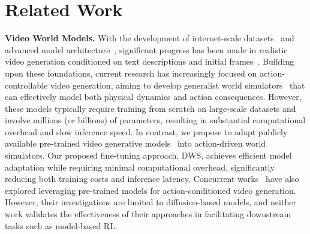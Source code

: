 \section{Related Work}
\textbf{Video World Models.} With the development of internet-scale datasets~\citep{Bain21,chen2024panda70m} and advanced model architecture~\citep{peebles2023dit,videoworldsimulators2024}, significant progress has been made in realistic video generation conditioned on text descriptions and
initial frames~\citep{blattmann2023SDVideo,lin2024opensoraplan, ma2024latte, yang2024cogvideox,opensora}. Building upon these foundations, current research has increasingly focused on action-controllable video generation, aiming to develop generalist world simulators~\citep{xiang2024pandora,yang2023learning,bruce2024genie,feng2024matrix,valevski2024diffusion,genie2,FangqiIRASim2024,2025gamegen} that can effectively model both physical dynamics and action consequences. However, these models typically require training from scratch on large-scale datasets and involve millions (or billions) of parameters, resulting in substantial computational overhead and slow inference speed. In contrast, we propose to adapt publicly available pre-trained video generative models~\citep{opensora,wu2024ivideogpt} into action-driven world simulators. Our proposed fine-tuning approach, DWS, achieves efficient model adaptation while requiring minimal computational overhead, significantly reducing both training costs and inference latency. Concurrent works~\citep{rigter2024avid,yu2025gamefactory} have also explored leveraging pre-trained models for action-conditioned video generation. However, their investigations are limited to diffusion-based models, and neither work validates the effectiveness of their approaches in facilitating downstream tasks such as model-based RL.

